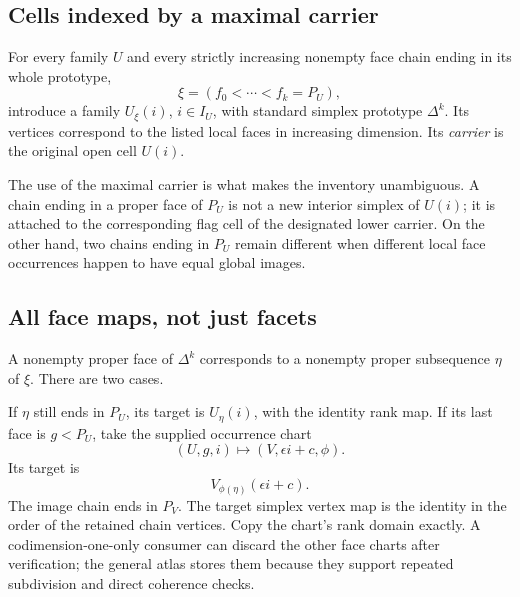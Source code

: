 \documentclass[11pt]{article}
\theoremstyle{definition}\newtheorem{definition}[theorem]{Definition}
\theoremstyle{remark}\newtheorem{remark}[theorem]{Remark}
\begin{document}
\subsection{Cells indexed by a maximal carrier}
For every family \(U\) and every strictly increasing nonempty face chain ending in its whole prototype,
\[
                         \xi=(f_0<\cdots<f_k=P_U),
\]
introduce a family \(U_\xi(i)\), \(i\in I_U\), with standard simplex prototype \(\Delta^k\). Its vertices correspond to the listed local faces in increasing dimension. Its \emph{carrier} is the original open cell \(U(i)\).

The use of the maximal carrier is what makes the inventory unambiguous. A chain ending in a proper face of \(P_U\) is not a new interior simplex of \(U(i)\); it is attached to the corresponding flag cell of the designated lower carrier. On the other hand, two chains ending in \(P_U\) remain different when different local face occurrences happen to have equal global images.

\subsection{All face maps, not just facets}
A nonempty proper face of \(\Delta^k\) corresponds to a nonempty proper subsequence \(\eta\) of \(\xi\). There are two cases.

If \(\eta\) still ends in \(P_U\), its target is \(U_\eta(i)\), with the identity rank map. If its last face is \(g<P_U\), take the supplied occurrence chart
\[
             (U,g,i)\longmapsto(V,\epsilon i+c,\phi).
\]
Its target is
\begin{equation}\label{eq:flag-face}
                         V_{\phi(\eta)}(\epsilon i+c).
\end{equation}
The image chain ends in \(P_V\). The target simplex vertex map is the identity in the order of the retained chain vertices. Copy the chart's rank domain exactly. A codimension-one-only consumer can discard the other face charts after verification; the general atlas stores them because they support repeated subdivision and direct coherence checks.
\end{document}

